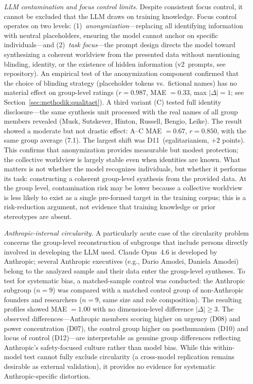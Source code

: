 \documentclass[12pt,a4paper]{article}
\begin{document}
\emph{LLM contamination and focus control limits.} Despite consistent focus control, it cannot be excluded that the LLM draws on training knowledge. Focus control operates on two levels: (1)~\emph{anonymization}---replacing all identifying information with neutral placeholders, ensuring the model cannot anchor on specific individuals---and (2)~\emph{task focus}---the prompt design directs the model toward synthesizing a coherent worldview from the presented data without mentioning blinding, identity, or the existence of hidden information (v2~prompts, see repository). An empirical test of the anonymization component confirmed that the choice of blinding strategy (placeholder tokens vs.\ fictional names) has no material effect on group-level ratings ($r = 0.987$, MAE $= 0.33$, max $|\Delta| = 1$; see Section~\ref{sec:methodik:qualitaet}). A third variant (C) tested full identity disclosure---the same synthesis unit processed with the real names of all group members revealed (Musk, Sutskever, Hinton, Russell, Bengio, Leike). The result showed a moderate but not drastic effect: A--C MAE $= 0.67$, $r = 0.850$, with the same group average (7.1). The largest shift was D11~(egalitarianism, $+2$ points). This confirms that anonymization provides measurable but modest protection; the collective worldview is largely stable even when identities are known. What matters is not whether the model recognizes individuals, but whether it performs its task: constructing a coherent group-level synthesis from the provided data. At the group level, contamination risk may be lower because a collective worldview is less likely to exist as a single pre-formed target in the training corpus; this is a risk-reduction argument, not evidence that training knowledge or prior stereotypes are absent.

\emph{Anthropic-internal circularity.} A particularly acute case of the circularity problem concerns the group-level reconstruction of subgroups that include persons directly involved in developing the LLM used. Claude Opus~4.6 is developed by Anthropic; several Anthropic executives (e.g., Dario Amodei, Daniela Amodei) belong to the analyzed sample and their data enter the group-level syntheses. To test for systematic bias, a matched-sample control was conducted: the Anthropic subgroup ($n = 9$) was compared with a matched control group of non-Anthropic founders and researchers ($n = 9$, same size and role composition). The resulting profiles showed MAE $= 1.00$ with no dimension-level difference $|\Delta| \geq 3$. The observed differences---Anthropic members scoring higher on urgency (D08) and power concentration (D07), the control group higher on posthumanism (D10) and locus of control (D12)---are interpretable as genuine group differences reflecting Anthropic's safety-focused culture rather than model bias. While this within-model test cannot fully exclude circularity (a cross-model replication remains desirable as external validation), it provides no evidence for systematic Anthropic-specific distortion.
\end{document}
